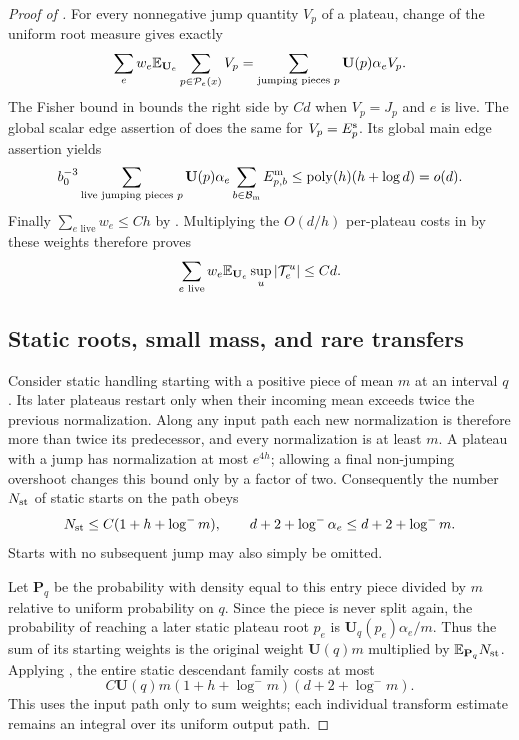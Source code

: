 \begin{proof}[Proof of ]
For every nonnegative jump quantity
$V_p$ of a plateau, change of the uniform root measure gives exactly
\begin{equation}\label{eq:09-weight-conversion}
 \sum_e w_e\mathbb E_{\mathbf U_e}\sum_{p\in\mathcal P_e(x)}V_p
   =\sum_{\text{jumping pieces }p}\mathbf U(p)\alpha_e V_p.
\end{equation}
The Fisher bound in  bounds the right side by
$Cd$ when $V_p=J_p$ and $e$ is live.  The global scalar edge assertion
of  does the same for $V_p=E_p^{\rm s}$.  Its global
main edge assertion yields
\[
 b_0^{-3}\sum_{\text{live jumping pieces }p}
       \mathbf U(p)\alpha_e\sum_{b\in\mathcal B_{\rm m}}E_{p,b}^{\rm m}
 \le \operatorname{poly}(h)(h+\log d)=o(d).
\]
Finally $\sum_{e\text{ live}}w_e\le Ch$ by
.  Multiplying the $O(d/h)$ per-plateau costs
in  by these weights therefore proves
\begin{equation}\label{eq:09-live-total}
 \sum_{e\text{ live}}w_e\mathbb E_{\mathbf U_e}\sup_u|\mathcal T_e^u|\le Cd.
\end{equation}

\subsection*{Static roots, small mass, and rare transfers}

Consider static handling starting with a positive piece of mean $m$ at
an interval $q$.  Its later plateaus restart only when their incoming
mean exceeds twice the previous normalization.  Along any input path
each new normalization is therefore more than twice its predecessor,
and every normalization is at least $m$.  A plateau with a jump has
normalization at most $e^{4h}$; allowing a final non-jumping overshoot
changes this bound only by a factor of two.  Consequently the number
$N_{\rm st}$ of static starts on the path obeys
\begin{equation}\label{eq:09-static-count}
 N_{\rm st}\le C(1+h+\log^-m),\qquad
 d+2+\log^-\alpha_e\le d+2+\log^-m.
\end{equation}
Starts with no subsequent jump may also simply be omitted.

Let $\mathbf P_q$ be the probability with density equal to this entry
piece divided by $m$ relative to uniform probability on $q$.  Since the
piece is never split again, the probability of reaching a later static
plateau root $p_e$ is
$\mathbf U_q(p_e)\alpha_e/m$.  Thus the sum of its starting weights is
the original weight $\mathbf U(q)m$ multiplied by
$\mathbb E_{\mathbf P_q}N_{\rm st}$.  Applying
, the entire static
descendant family costs at most
\begin{equation}\label{eq:09-static-family}
 C\mathbf U(q)m(1+h+\log^-m)(d+2+\log^-m).
\end{equation}
This uses the input path only to sum weights; each individual transform
estimate remains an integral over its uniform output path.


\end{proof}

